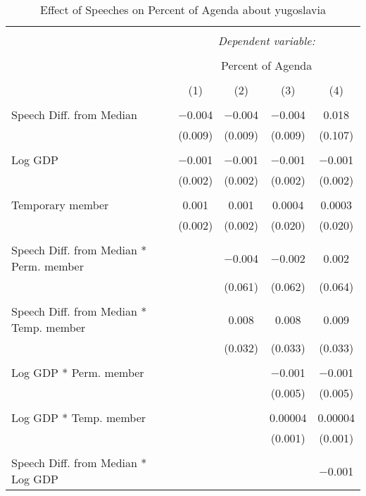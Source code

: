 
\begin{table}[!htbp] \centering 
  \caption{Effect of Speeches on Percent of Agenda about yugoslavia} 
  \label{} 
\begin{tabular}{@{\extracolsep{5pt}}lcccc} 
\\[-1.8ex]\hline 
\hline \\[-1.8ex] 
 & \multicolumn{4}{c}{\textit{Dependent variable:}} \\ 
\cline{2-5} 
\\[-1.8ex] & \multicolumn{4}{c}{Percent of Agenda} \\ 
\\[-1.8ex] & (1) & (2) & (3) & (4)\\ 
\hline \\[-1.8ex] 
 Speech Diff. from Median & $-$0.004 & $-$0.004 & $-$0.004 & 0.018 \\ 
  & (0.009) & (0.009) & (0.009) & (0.107) \\ 
  & & & & \\ 
 Log GDP & $-$0.001 & $-$0.001 & $-$0.001 & $-$0.001 \\ 
  & (0.002) & (0.002) & (0.002) & (0.002) \\ 
  & & & & \\ 
 Temporary member & 0.001 & 0.001 & 0.0004 & 0.0003 \\ 
  & (0.002) & (0.002) & (0.020) & (0.020) \\ 
  & & & & \\ 
 Speech Diff. from Median * Perm. member &  & $-$0.004 & $-$0.002 & 0.002 \\ 
  &  & (0.061) & (0.062) & (0.064) \\ 
  & & & & \\ 
 Speech Diff. from Median * Temp. member &  & 0.008 & 0.008 & 0.009 \\ 
  &  & (0.032) & (0.033) & (0.033) \\ 
  & & & & \\ 
 Log GDP * Perm. member &  &  & $-$0.001 & $-$0.001 \\ 
  &  &  & (0.005) & (0.005) \\ 
  & & & & \\ 
 Log GDP * Temp. member &  &  & 0.00004 & 0.00004 \\ 
  &  &  & (0.001) & (0.001) \\ 
  & & & & \\ 
 Speech Diff. from Median * Log GDP &  &  &  & $-$0.001 \\ 

\end{tabular}
\end{table}
